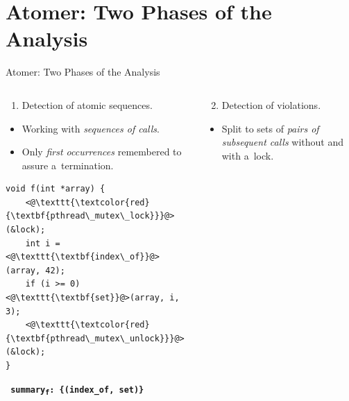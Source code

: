 \documentclass[10pt, hyperref={unicode}, aspectratio=169]{beamer}
\begin{document}
\section{Atomer: Two Phases of the Analysis}
\begin{frame}[fragile]{Atomer: Two Phases of the Analysis}
    \begin{columns}
        \begin{column}[T]{.5 \linewidth}
            \centering

            \begin{enumerate}
                \item
                    Detection of \alert{atomic sequences}.
            \end{enumerate}

            \begin{itemize}\setlength\itemsep{1em}
                \item
                    Working with \emph{sequences of calls}.

                \item
                    Only \emph{first occurrences} remembered to assure
                    a~termination.
            \end{itemize}

            \begin{lstlisting}
void f(int *array) {
    <@\texttt{\textcolor{red}{\textbf{pthread\_mutex\_lock}}}@>(&lock);
    int i = <@\texttt{\textbf{index\_of}}@>(array, 42);
    if (i >= 0) <@\texttt{\textbf{set}}@>(array, i, 3);
    <@\texttt{\textcolor{red}{\textbf{pthread\_mutex\_unlock}}}@>(&lock);
}
            \end{lstlisting}

            \alert{\textbf{\texttt{
                summary\textsubscript{f}: \{(index\_of, set)\}
            }}}
        \end{column}

        \begin{column}[T]{.5 \linewidth}
            \centering

            \begin{enumerate}\setcounter{enumi}{1}
                \item
                    Detection of \alert{violations}.
            \end{enumerate}

            \begin{itemize}
                \item
                    Split to sets of \emph{pairs of subsequent calls}
                    without and with a~lock.
            \end{itemize}


\end{column}
\end{columns}
\end{frame}
\end{document}
